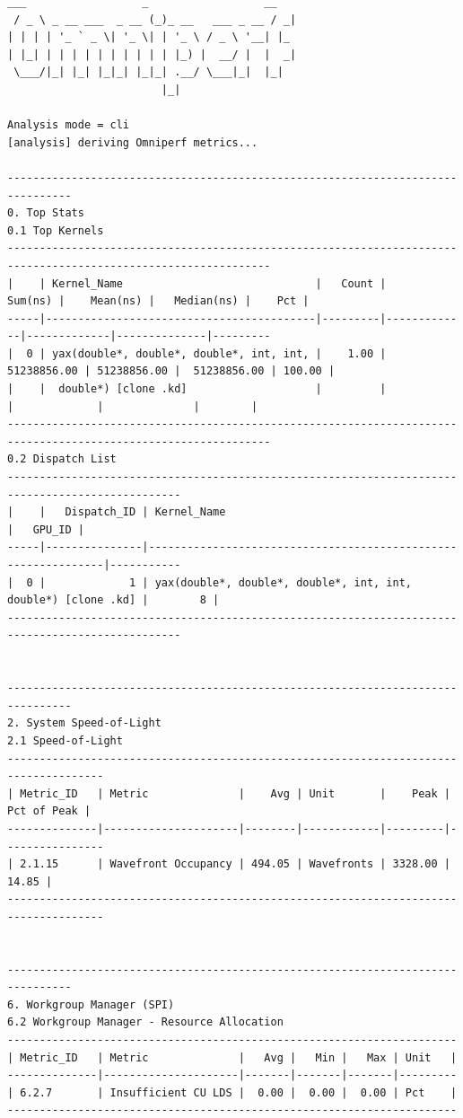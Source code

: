 \documentclass[
]{article}
\begin{document}
\begin{Verbatim}[fontsize=\footnotesize]
  ___                  _                  __
 / _ \ _ __ ___  _ __ (_)_ __   ___ _ __ / _|
| | | | '_ ` _ \| '_ \| | '_ \ / _ \ '__| |_
| |_| | | | | | | | | | | |_) |  __/ |  |  _|
 \___/|_| |_| |_|_| |_|_| .__/ \___|_|  |_|
                        |_|

Analysis mode = cli
[analysis] deriving Omniperf metrics...

--------------------------------------------------------------------------------
0. Top Stats
0.1 Top Kernels
---------------------------------------------------------------------------------------------------------------
|    | Kernel_Name                              |   Count |     Sum(ns) |    Mean(ns) |   Median(ns) |    Pct |
-----|------------------------------------------|---------|-------------|-------------|--------------|---------
|  0 | yax(double*, double*, double*, int, int, |    1.00 | 51238856.00 | 51238856.00 |  51238856.00 | 100.00 |
|    |  double*) [clone .kd]                    |         |             |             |              |        |
---------------------------------------------------------------------------------------------------------------
0.2 Dispatch List
-------------------------------------------------------------------------------------------------
|    |   Dispatch_ID | Kernel_Name                                                   |   GPU_ID |
-----|---------------|---------------------------------------------------------------|-----------
|  0 |             1 | yax(double*, double*, double*, int, int, double*) [clone .kd] |        8 |
-------------------------------------------------------------------------------------------------


--------------------------------------------------------------------------------
2. System Speed-of-Light
2.1 Speed-of-Light
-------------------------------------------------------------------------------------
| Metric_ID   | Metric              |    Avg | Unit       |    Peak |   Pct of Peak |
--------------|---------------------|--------|------------|---------|----------------
| 2.1.15      | Wavefront Occupancy | 494.05 | Wavefronts | 3328.00 |         14.85 |
-------------------------------------------------------------------------------------


--------------------------------------------------------------------------------
6. Workgroup Manager (SPI)
6.2 Workgroup Manager - Resource Allocation
----------------------------------------------------------------------
| Metric_ID   | Metric              |   Avg |   Min |   Max | Unit   |
--------------|---------------------|-------|-------|-------|---------
| 6.2.7       | Insufficient CU LDS |  0.00 |  0.00 |  0.00 | Pct    |
----------------------------------------------------------------------
\end{Verbatim}
\end{document}
